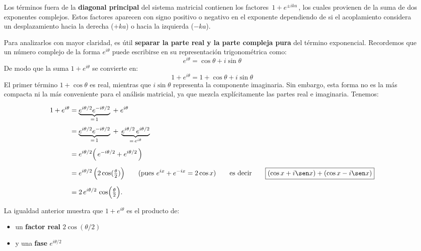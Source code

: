 \documentclass{article}
\begin{document}
Los términos fuera de la \textbf{diagonal principal} del sistema matricial contienen los factores
\(\,1+e^{\pm ika}\,\), los cuales provienen de la suma de dos exponentes complejos.  
Estos factores aparecen con signo positivo o negativo en el exponente dependiendo de si el acoplamiento
considera un desplazamiento hacia la derecha (\(+ka\)) o hacia la izquierda (\(-ka\)).  

Para analizarlos con mayor claridad, es útil \textbf{separar la parte real y la parte compleja pura} del término
exponencial. Recordemos que un número complejo de la forma \(e^{i\theta}\) puede escribirse en su
representación trigonométrica como:
\[
e^{i\theta} = \cos\theta + i\sin\theta
\]
De modo que la suma \(1 + e^{i\theta}\) se convierte en:
\[
1 + e^{i\theta} = 1 + \cos\theta + i\sin\theta
\]
El primer término \(1+\cos\theta\) es real, mientras que \(i\sin\theta\) representa la componente imaginaria.  
Sin embargo, esta forma no es la más compacta ni la más conveniente para el análisis matricial, ya que
mezcla explícitamente las partes real e imaginaria.  
Tenemos:



\begin{equation}
\begin{split}
1 + e^{i\theta}
&= \underbrace{e^{i\theta/2}e^{-i\theta/2}}_{=\,1} \;+\; e^{i\theta}\\[4pt]
&= \underbrace{e^{i\theta/2}e^{-i\theta/2}}_{=\,1} \;+\; \underbrace{e^{i\theta/2}\,e^{i\theta/2}}_{=\,e^{i\theta}} \\[4pt]
&= e^{i\theta/2}\Big(\,e^{-i\theta/2} + e^{i\theta/2}\,\Big) \\[6pt]
&= e^{i\theta/2}\,\Big(2\cos(\tfrac{\theta}{2})\Big) \qquad \text{(pues $e^{ix}+e^{-ix}=2\cos x$)} \qquad \text{es decir} \qquad \boxed{(\cos x + i \sen x) + (\cos x - i \sen x)} \\[6pt]
&= 2\,e^{i\theta/2}\,\cos\!\Big(\tfrac{\theta}{2}\Big).
\end{split}
\label{eq:identidad_suma_exp_positiva}
\end{equation}


La igualdad anterior muestra que $1+e^{i\theta}$ es el producto de:
\begin{itemize}
  \item[$\bullet$] un \textbf{factor real} $2\cos(\theta/2)$
  \item[$\bullet$] y una \textbf{fase} $e^{i\theta/2}$
\end{itemize}
\end{document}

